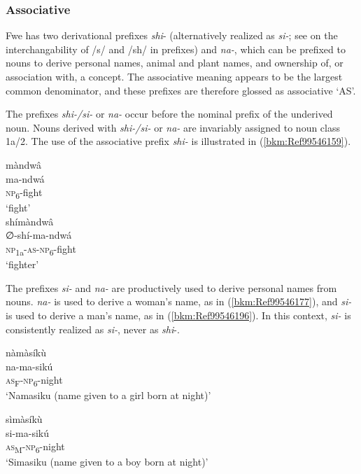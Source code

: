 \newpage
\subsubsection{Associative}

Fwe has two derivational prefixes \textit{shi}- (alternatively realized as \textit{si-}; see  on the interchangability of /s/ and /sh/ in prefixes) and \textit{na-}, which can be prefixed to nouns to derive personal names, animal and plant names, and ownership of, or association with, a concept. The associative meaning appears to be the largest common denominator, and these prefixes are therefore glossed as associative ‘AS’.

The prefixes \textit{shi-/si-} or \textit{na-} occur before the nominal prefix of the underived noun. Nouns derived with \textit{shi-/si-} or \textit{na-} are invariably assigned to noun class 1a/2. The use of the associative prefix \textit{shi-} is illustrated in (\ref{bkm:Ref99546159}).

\ea
\label{bkm:Ref99546159}
\ea
\glll màndwâ\\
ma-ndwá   \\
\textsc{np}\textsubscript{6}-fight\\
\glt ‘fight’\\   
\ex
\glll shímàndwâ\\
∅-shí-ma-ndwá\\
\textsc{np}\textsubscript{1a}-\textsc{as}-\textsc{np}\textsubscript{6}-fight\\
\glt ‘fighter’
\z\z

The prefixes \textit{si-} and \textit{na-} are productively used to derive personal names from nouns. \textit{na-} is used to derive a woman’s name, as in (\ref{bkm:Ref99546177}), and \textit{si-} is used to derive a man’s name, as in (\ref{bkm:Ref99546196}). In this context, \textit{si-} is consistently realized as \textit{si-}, never as \textit{shi}-.

\ea
\label{bkm:Ref99546177}
\glll nàmàsíkù\\
na-ma-sikú\\
\textsc{as}\textsubscript{F}-\textsc{np}\textsubscript{6}-night\\
\glt ‘Namasiku (name given to a girl born at night)’
\z

\ea
\label{bkm:Ref99546196}
\glll sìmàsíkù\\
si-ma-sikú\\
\textsc{as}\textsubscript{M}-\textsc{np}\textsubscript{6}-night\\
\glt ‘Simasiku (name given to a boy born at night)’
\z

